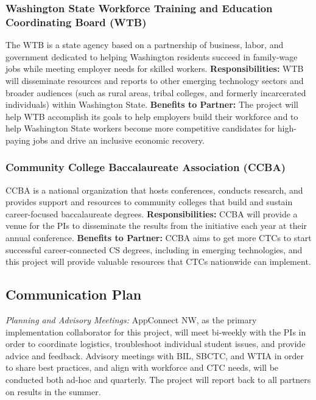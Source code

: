 \subsubsection{Washington State Workforce Training and Education Coordinating Board (WTB)}

The WTB is a state agency based on a partnership of business, labor, and government dedicated to helping Washington residents succeed in family-wage jobs while meeting employer needs for skilled workers. \textbf{Responsibilities:} WTB will disseminate resources and reports to other emerging technology sectors and broader audiences (such as rural areas, tribal colleges, and formerly incarcerated individuals) within Washington State. \textbf{Benefits to Partner:} The project will help WTB accomplish its goals to help employers build their workforce and to help Washington State workers become more competitive candidates for high-paying jobs and drive an inclusive economic recovery.


\subsubsection{Community College Baccalaureate Association (CCBA)}

CCBA is a national organization that hosts conferences, conducts research, and provides support and resources to community colleges that build and sustain career-focused baccalaureate degrees. \textbf{Responsibilities:} CCBA will provide a venue for the PIs to disseminate the results from the initiative each year at their annual conference. \textbf{Benefits to Partner:} CCBA aims to get more CTCs to start successful career-connected CS degrees, including in emerging technologies, and this project will provide valuable resources that CTCs nationwide can implement.

\subsection{Communication Plan}

\textit{Planning and Advisory Meetings:} AppConnect NW, as the primary implementation collaborator for this project, will meet bi-weekly with the PIs in order to coordinate logistics, troubleshoot individual student issues, and provide advice and feedback. Advisory meetings with BIL, SBCTC, and WTIA in order to share best practices, and align with workforce and CTC needs, will be conducted both ad-hoc and quarterly. The project will report back to all partners on results in the summer.

